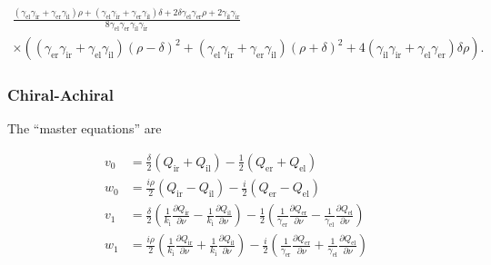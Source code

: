 \begin{multline*}
  \frac{(\gamma_\text{el} \gamma_\text{ir}+\gamma_\text{er} \gamma_\text{il})\rho +(\gamma_\text{el} \gamma_\text{ir}+\gamma_\text{er} \gamma_\text{il})\delta+2\delta \gamma_\text{el} \gamma_\text{er} \rho+2 \gamma_\text{il} \gamma_\text{ir}}{8 \gamma_\text{el} \gamma_\text{er} \gamma_\text{il} \gamma_\text{ir}}\\
  \times\left((\gamma_\text{er} \gamma_\text{ir} + \gamma_\text{el} \gamma_\text{il}) (\rho-\delta)^2 + (\gamma_\text{el} \gamma_\text{ir}+\gamma_\text{er}\gamma_\text{il})(\rho + \delta)^2 + 4(\gamma_\text{il} \gamma_\text{ir} + \gamma_\text{el} \gamma_\text{er})\delta\rho\right).  
\end{multline*}

\subsubsection{Chiral-Achiral}


The ``master equations'' are

\begin{align*}
  v_0 &= \frac{\delta}{2}(Q_\text{ir} + Q_\text{il}) - \frac{1}{2}(Q_\text{er} + Q_\text{el}) \\
  w_0 &= \frac{i\rho}{2}(Q_\text{ir} - Q_\text{il}) -\frac{i}{2}(Q_\text{er} - Q_\text{el}) \\
  v_1 &=\frac{\delta}{2}\left(\frac{1}{k_\text{i}}\frac{\partial Q_\text{ir}}{\partial\nu} - \frac{1}{k_\text{i}}\frac{\partial Q_\text{il}}{\partial\nu}\right) -\frac{1}{2}\left(\frac{1}{\gamma_\text{er}}\frac{\partial Q_\text{er}}{\partial\nu} - \frac{1}{\gamma_\text{el}}\frac{\partial Q_\text{el}}{\partial\nu}\right) \\
  w_1 &=\frac{i\rho}{2}\left(\frac{1}{k_\text{i}}\frac{\partial Q_\text{ir}}{\partial\nu} + \frac{1}{k_\text{i}}\frac{\partial Q_\text{il}}{\partial\nu}\right) -\frac{i}{2}\left(\frac{1}{\gamma_\text{er}}\frac{\partial Q_\text{er}}{\partial\nu} + \frac{1}{\gamma_\text{el}}\frac{\partial Q_\text{el}}{\partial\nu}\right) \\
\end{align*}

